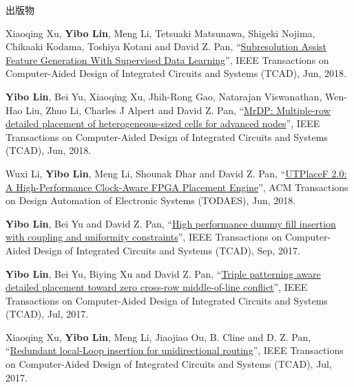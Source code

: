 \begin{rSection}{出版物}
\begin{description}[font=\normalfont]
{}
            

\item[{[J10]}]{
        Xiaoqing Xu, \textbf{Yibo Lin}, Meng Li, Tetsuaki Matsunawa, Shigeki Nojima, Chikaaki Kodama, Toshiya Kotani and David Z. Pan, 
    ``\href{https://doi.org/10.1109/TCAD.2017.2748029}{Subresolution Assist Feature Generation With Supervised Data Learning}'', 
    IEEE Transactions on Computer-Aided Design of Integrated Circuits and Systems (TCAD), Jun, 2018.
    
}
            

\item[{[J9]}]{
        \textbf{Yibo Lin}, Bei Yu, Xiaoqing Xu, Jhih-Rong Gao, Natarajan Viswanathan, Wen-Hao Liu, Zhuo Li, Charles J Alpert and David Z. Pan, 
    ``\href{https://doi.org/10.1109/TCAD.2017.2748025}{MrDP: Multiple-row detailed placement of heterogeneous-sized cells for advanced nodes}'', 
    IEEE Transactions on Computer-Aided Design of Integrated Circuits and Systems (TCAD), Jun, 2018.
    
}
            

\item[{[J8]}]{
        Wuxi Li, \textbf{Yibo Lin}, Meng Li, Shounak Dhar and David Z. Pan, 
    ``\href{https://doi.org/10.1145/3174849}{UTPlaceF 2.0: A High-Performance Clock-Aware FPGA Placement Engine}'', 
    ACM Transactions on Design Automation of Electronic Systems (TODAES), Jun, 2018.
    
}
            

\item[{[J7]}]{
        \textbf{Yibo Lin}, Bei Yu and David Z. Pan, 
    ``\href{http://dx.doi.org/10.1109/TCAD.2016.2638452}{High performance dummy fill insertion with coupling and uniformity constraints}'', 
    IEEE Transactions on Computer-Aided Design of Integrated Circuits and Systems (TCAD), Sep, 2017.
    
}
            

\item[{[J6]}]{
        \textbf{Yibo Lin}, Bei Yu, Biying Xu and David Z. Pan, 
    ``\href{http://dx.doi.org/10.1109/TCAD.2017.2648843}{Triple patterning aware detailed placement toward zero cross-row middle-of-line conflict}'', 
    IEEE Transactions on Computer-Aided Design of Integrated Circuits and Systems (TCAD), Jul, 2017.
    
}
            

\item[{[J5]}]{
        Xiaoqing Xu, \textbf{Yibo Lin}, Meng Li, Jiaojiao Ou,  B. Cline  and  D. Z. Pan, 
    ``\href{http://dx.doi.org/10.1109/TCAD.2017.2651811}{Redundant local-Loop insertion for unidirectional routing}'', 
    IEEE Transactions on Computer-Aided Design of Integrated Circuits and Systems (TCAD), Jul, 2017.
    
}
\end{description}
\end{rSection}
